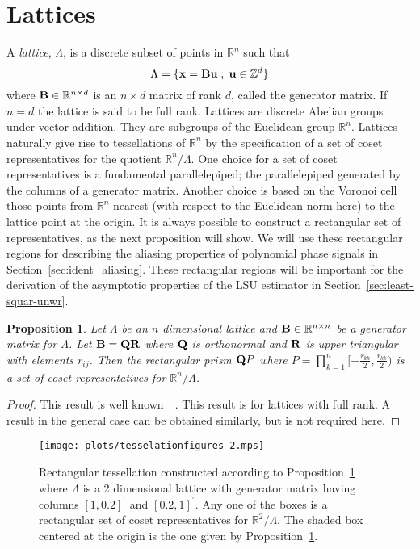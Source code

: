 \documentclass[aap,preprint]{imsart}
\newcommand{\reals}{{\mathbb R}}
\newcommand{\ints}{{\mathbb Z}}
\newcommand{\term}{\emph}
\renewcommand{\mid}{\; ; \;}
\newtheorem{proposition}{Proposition}
\begin{document}
\section{Lattices}\label{sec:lattice-theory}

A \term{lattice},  $\Lambda$, is a discrete subset of points in $\reals^n$ such that
\[
   \Lambda = \{\xbf = \Bbf\ubf \mid \ubf \in \ints^d \}
\]
where $\Bbf \in \reals^{n \times d}$ is an $n \times d$ matrix of rank $d$, called the generator matrix.  If $n = d$ the lattice is said to be full rank.  Lattices are discrete Abelian groups under vector addition.  They are subgroups of the Euclidean group $\reals^n$.  Lattices naturally give rise to tessellations of $\reals^n$ by the specification of a set of coset representatives for the quotient $\reals^n / \Lambda$.  One choice for a set of coset representatives is a fundamental parallelepiped; the parallelepiped generated by the columns of a generator matrix.  Another choice is based on the Voronoi cell those points from $\reals^n$ nearest (with respect to the Euclidean norm here) to the lattice point at the origin.  It is always possible to construct a rectangular set of representatives, as the next proposition will show.  We will use these rectangular regions for describing the aliasing properties of polynomial phase signals in Section~\ref{sec:ident_aliasing}.  These rectangular regions will be important for the derivation of the asymptotic properties of the LSU estimator in Section~\ref{sec:least-squar-unwr}.

\begin{proposition}\label{prop:lattice-theory-constructing_a_rectangular_tesselating_region}
Let  $\Lambda$ be an $n$ dimensional lattice and $\Bbf \in \reals^{n\times n}$ be a generator matrix for $\Lambda$. Let $\mathbf{B} = \mathbf{Q}\mathbf{R}$ where $\mathbf{Q}$ is orthonormal and $\mathbf{R}$ is upper triangular with elements $r_{ij}$.  Then the rectangular prism $\mathbf{Q} P$ where $P = \prod_{k=1}^{n}{[-\tfrac{r_{kk}}{2}, \frac{r_{kk}}{2})}$ is a set of coset representatives for $\reals^n / \Lambda$.
\end{proposition}
\begin{proof}
This result is well known~\cite[Chapter IX, Theorem IV]{Cassels_geom_numbers_1997}~\cite[Proposition 2.1]{McKilliam2010thesis}.  This result is for lattices with full rank.  A result in the general case can be obtained similarly, but is not required here.  
\end{proof}

\begin{figure}[t]
	\centering
		\texttt{[image: plots/tesselationfigures-2.mps]}
		\caption{Rectangular tessellation constructed according to Proposition~\ref{prop:lattice-theory-constructing_a_rectangular_tesselating_region} where $\Lambda$ is a 2 dimensional lattice with generator matrix having columns $[1, 0.2]^\prime$ and $[0.2, 1]^\prime$. Any one of the boxes is a rectangular set of coset representatives for $\reals^2 / \Lambda$.  The shaded box centered at the origin is the one given by Proposition~\ref{prop:lattice-theory-constructing_a_rectangular_tesselating_region}.}
		\label{lattices:fig:tessellation2}
\end{figure} 
\end{document}
